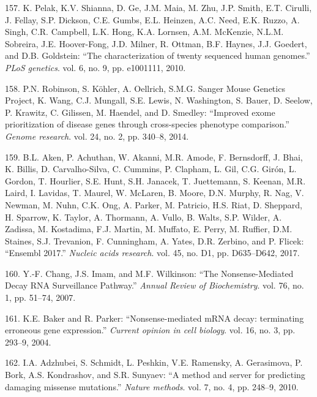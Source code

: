 \documentclass[12pt,twoside]{reedthesis}
\theoremstyle{definition}
\theoremstyle{definition}
\theoremstyle{remark}
\begin{document}
  \hypertarget{ref-Pelak2010}{}
  157. K. Pelak, K.V. Shianna, D. Ge, J.M. Maia, M. Zhu, J.P. Smith, E.T.
  Cirulli, J. Fellay, S.P. Dickson, C.E. Gumbs, E.L. Heinzen, A.C. Need,
  E.K. Ruzzo, A. Singh, C.R. Campbell, L.K. Hong, K.A. Lornsen, A.M.
  McKenzie, N.L.M. Sobreira, J.E. Hoover-Fong, J.D. Milner, R. Ottman,
  B.F. Haynes, J.J. Goedert, and D.B. Goldstein: ``The characterization of
  twenty sequenced human genomes.'' \emph{PLoS genetics}. vol. 6, no. 9,
  pp. e1001111, 2010.
  
  \hypertarget{ref-Robinson2014}{}
  158. P.N. Robinson, S. Köhler, A. Oellrich, S.M.G. Sanger Mouse Genetics
  Project, K. Wang, C.J. Mungall, S.E. Lewis, N. Washington, S. Bauer, D.
  Seelow, P. Krawitz, C. Gilissen, M. Haendel, and D. Smedley: ``Improved
  exome prioritization of disease genes through cross-species phenotype
  comparison.'' \emph{Genome research}. vol. 24, no. 2, pp. 340--8, 2014.
  
  \hypertarget{ref-Aken2017}{}
  159. B.L. Aken, P. Achuthan, W. Akanni, M.R. Amode, F. Bernsdorff, J.
  Bhai, K. Billis, D. Carvalho-Silva, C. Cummins, P. Clapham, L. Gil, C.G.
  Girón, L. Gordon, T. Hourlier, S.E. Hunt, S.H. Janacek, T. Juettemann,
  S. Keenan, M.R. Laird, I. Lavidas, T. Maurel, W. McLaren, B. Moore, D.N.
  Murphy, R. Nag, V. Newman, M. Nuhn, C.K. Ong, A. Parker, M. Patricio,
  H.S. Riat, D. Sheppard, H. Sparrow, K. Taylor, A. Thormann, A. Vullo, B.
  Walts, S.P. Wilder, A. Zadissa, M. Kostadima, F.J. Martin, M. Muffato,
  E. Perry, M. Ruffier, D.M. Staines, S.J. Trevanion, F. Cunningham, A.
  Yates, D.R. Zerbino, and P. Flicek: ``Ensembl 2017.'' \emph{Nucleic
  acids research}. vol. 45, no. D1, pp. D635--D642, 2017.
  
  \hypertarget{ref-Chang2007}{}
  160. Y.-F. Chang, J.S. Imam, and M.F. Wilkinson: ``The Nonsense-Mediated
  Decay RNA Surveillance Pathway.'' \emph{Annual Review of Biochemistry}.
  vol. 76, no. 1, pp. 51--74, 2007.
  
  \hypertarget{ref-Baker2004}{}
  161. K.E. Baker and R. Parker: ``Nonsense-mediated mRNA decay:
  terminating erroneous gene expression.'' \emph{Current opinion in cell
  biology}. vol. 16, no. 3, pp. 293--9, 2004.
  
  \hypertarget{ref-Adzhubei2010}{}
  162. I.A. Adzhubei, S. Schmidt, L. Peshkin, V.E. Ramensky, A.
  Gerasimova, P. Bork, A.S. Kondrashov, and S.R. Sunyaev: ``A method and
  server for predicting damaging missense mutations.'' \emph{Nature
  methods}. vol. 7, no. 4, pp. 248--9, 2010.
  
\end{document}
